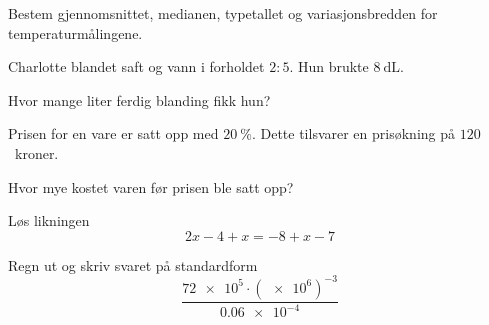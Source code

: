 Bestem gjennomsnittet, medianen, typetallet og variasjonsbredden for
temperaturmålingene.


\Oppgave[1] 

Charlotte blandet saft og vann i forholdet $2:5$. Hun brukte
$\SI{8}{\deci\liter}$. \bigskip

Hvor mange liter ferdig blanding fikk hun?


\Oppgave[1] 

Prisen for en vare er satt opp med $\SI{20}{\percent}$. Dette tilsvarer en
prisøkning på $120$~kroner. \bigskip

Hvor mye kostet varen før prisen ble satt opp?


\Oppgave[1] 

Løs likningen
%
\begin{equation*}
  2x - 4 + x = -8 + x - 7
\end{equation*}


\Oppgave[2] 

Regn ut og skriv svaret på standardform
%
\begin{equation*}
  \frac{\num{72e5}\cdot(\num{e6})^{-3}}{\num{0.06e-4}}
\end{equation*}


\Oppgave[3]

